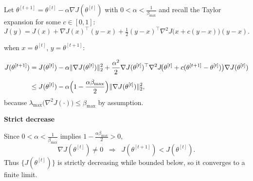 \begin{answer}
Let $\theta^{[t+1]}=\theta^{[t]}-\alpha\nabla J(\theta^{[t]})$ with  
$0<\alpha<\tfrac{1}{\beta_{\max}}$ and recall the Taylor expansion  
for some $c\in[0,1]$:
\[
  J(y)=J(x)+\nabla J(x)^{\top}(y-x)
        +\tfrac12 (y-x)^{\top}\nabla^{2}J\!\bigl(x+c(y-x)\bigr)(y-x).
\]

when $x=\theta^{[t]}$, $y=\theta^{[t+1]}$:

\[
\begin{aligned}
J(\theta^{[t+1]})
 &= J(\theta^{[t]})
    -\alpha\|\nabla J(\theta^{[t]})\|_{2}^{2}
    +\frac{\alpha^{2}}{2} 
        \nabla J(\theta^{[t]})^{\top}
        \nabla^{2}J\!\bigl(\theta^{[t]}+c(\theta^{[t+1]}-\theta^{[t]})\bigr)
        \nabla J(\theta^{[t]}) \\[4pt]
 &\le J(\theta^{[t]})
      -\alpha\Bigl(1-\frac{\alpha\beta_{\max}}{2}\Bigr)
      \|\nabla J(\theta^{[t]})\|_{2}^{2},
\end{aligned}
\]
because 
$\lambda_{\max}\bigl(\nabla^{2}J(\cdot)\bigr)\le\beta_{\max}$ by assumption.

\textbf{Strict decrease}

Since $0<\alpha<\tfrac{1}{\beta_{\max}}$ implies 
$1-\frac{\alpha\beta_{\max}}{2}>0$,
\[
  \nabla J(\theta^{[t]})\neq 0
  \;\;\Longrightarrow\;\;
  J(\theta^{[t+1]})<J(\theta^{[t]}).
\]
Thus $\{J(\theta^{[t]})\}$ is strictly decreasing while bounded
below, so it converges to a finite limit.
\end{answer}

